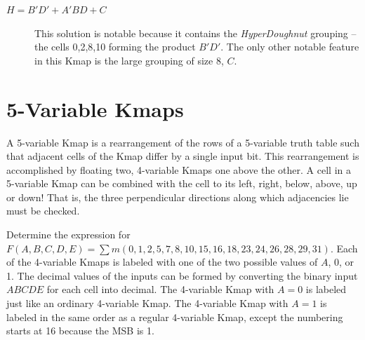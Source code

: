 \begin{process:minimizationKmap}
\begin{description}
\item [$H=B'D'+A'BD+C$] 
This solution is notable because it contains the 
{\it HyperDoughnut}  grouping -- the cells
0,2,8,10 forming the product $B'D'$.  The only other notable 
feature in this Kmap is the large grouping of size 8, $C$.
\end{description}


\section{5-Variable Kmaps}
A 5-variable Kmap is a rearrangement of the rows of a 5-variable
truth table such that adjacent cells of the Kmap differ by a single
input bit.  This rearrangement is accomplished by floating two, 4-variable 
Kmaps one above the other.  A cell in a 5-variable Kmap can be combined with
the cell to its left, right, below, above, up or down!  That is, the three
perpendicular directions along which adjacencies lie must be checked.

Determine the \SOPmin expression for \\
$F(A,B,C,D,E) = \sum m(0,1,2,5,7,8,10,15,16,18,23,24,26,28,29,31)$.
Each of the 4-variable Kmaps is labeled with one of the two possible
values of $A$, 0, or 1.  The decimal values of the inputs can be formed
by converting the binary input $ABCDE$ for each cell into decimal.  The 
4-variable Kmap with $A=0$ is labeled just like an ordinary 4-variable 
Kmap.  The 4-variable Kmap with $A=1$ is labeled in the same order as a 
regular 4-variable Kmap, except the numbering starts at 16 because the MSB
is 1.


\end{process:minimizationKmap}

